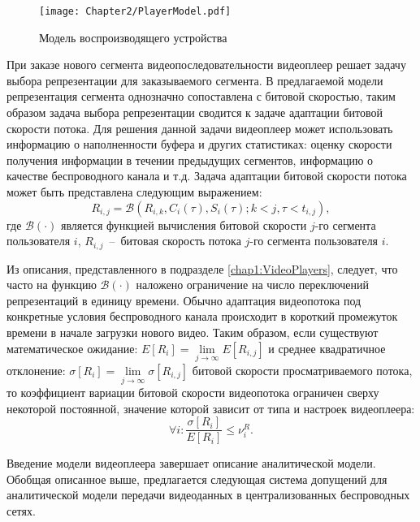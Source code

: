 \begin{figure}[htbp]
\begin{center}
\texttt{[image: Chapter2/PlayerModel.pdf]}
\caption{Модель воспроизводящего устройства}
\label{fig:PlayerModel}
\end{center}
\end{figure}

При заказе нового сегмента видеопоследовательности видеоплеер решает задачу выбора репрезентации для заказываемого сегмента. В предлагаемой модели репрезентация сегмента однозначно сопоставлена с битовой скоростью, таким образом задача выбора репрезентации сводится к задаче адаптации битовой скорости потока. Для решения данной задачи видеоплеер может использовать информацию о наполненности буфера и других статистиках: оценку скорости получения информации в течении предыдущих сегментов, информацию о качестве беспроводного канала и т.д. Задача адаптации битовой скорости потока может быть представлена следующим выражением:
\begin{equation}
\nonumber
R_{i,j} = \mathcal{B}\left(R_{i,k}, C_i(\tau), S_i(\tau); k < j, \tau<t_{i,j} \right),
\end{equation}
где $\mathcal{B}\left(\cdot\right)$ является функцией вычисления битовой скорости $j$-го сегмента пользователя $i$, $R_{i,j}$~--~битовая скорость потока $j$-го сегмента пользователя $i$.

Из описания, представленного в подразделе \ref{chap1:VideoPlayers}, следует, что часто на функцию $\mathcal{B}\left(\cdot\right)$ наложено ограничение на число переключений репрезентаций в единицу времени. Обычно адаптация видеопотока под конкретные условия беспроводного канала происходит в короткий промежуток времени в начале загрузки нового видео. Таким образом, если существуют математическое ожидание: $E[R_i] = \lim\limits_{j \rightarrow \infty}E[R_{i,j}]$ и среднее квадратичное отклонение: $\sigma\left[R_{i}\right] = \lim\limits_{j \rightarrow \infty}\sigma\left[R_{i,j}\right] $ битовой скорости просматриваемого потока, то коэффициент вариации битовой скорости видеопотока ограничен сверху некоторой постоянной, значение которой зависит от типа и настроек видеоплеера:
\begin{equation}
\forall i: \frac{ \sigma\left[R_{i}\right] }{ E\left[R_{i}\right]} \leq \nu^R_i.
\label{eq:SwitchRatio}
\end{equation}

Введение модели видеоплеера завершает описание аналитической модели. Обобщая описанное выше, предлагается следующая система допущений для аналитической модели передачи видеоданных в централизованных беспроводных сетях.

